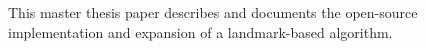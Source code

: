 


\begin{abstracts}        %

This master thesis paper describes and documents the open-source implementation and expansion of a landmark-based algorithm. 

\end{abstracts}


